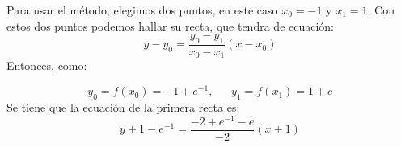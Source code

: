 \documentclass[11pt, a4paper]{exam}
\begin{document}
\begin{questions}
\begin{parts}
\begin{solution}
\begin{center}
            \end{center}
            
            Para usar el método, elegimos dos puntos, en este caso $x_0 =-1$ y $x_1 = 1$. Con estos dos puntos podemos hallar su recta, que tendra de ecuación: 
            \begin{equation*}
                y - y_0 = \frac{y_0 - y_1}{x_0 - x_1}(x - x_0)
            \end{equation*}
            Entonces, como: 

            \begin{equation*}
                y_0 = f(x_0) = -1 + e^{-1}, \ \ \ \ \ \ \  y_1 = f(x_1) = 1 + e
            \end{equation*}
            Se tiene que la ecuación de la primera recta es: 
            \begin{equation*}
                y + 1 - e^{-1} = \frac{-2 + e^{-1} - e}{-2}(x+1)
            \end{equation*}

            \begin{center}
\end{center}
\end{solution}
\end{parts}
\end{questions}
\end{document}
